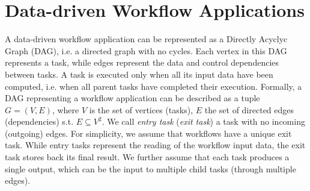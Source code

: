 \documentclass[a4paper, 10pt, conference]{ieeeconf}      %
\begin{document}
\section{Data-driven Workflow Applications}
\label{section:dag_applications}


A data-driven workflow application can be represented as a Directly Acyclyc Graph (DAG), i.e. a directed graph with no cycles. Each vertex in this DAG represents a task, while edges represent the data and control dependencies between tasks.  A task is executed only when all its input data have been computed, i.e. when all parent tasks have completed their execution.
Formally, a DAG representing a workflow application can be described as a tuple $G=(V,E)$, where $V$ is the set of vertices (tasks), $E$ the set of directed edges (dependencies) s.t. $E\subseteq V^2$.
We call \textit{entry task} (\textit{exit task}) a task with no incoming (outgoing) edges. For simplicity, we assume that workflows have a unique exit task.  While entry tasks represent the reading of the workflow input data, the exit task stores back its final result. We further assume that each task produces a single output, which can be the input to multiple child tasks (through multiple edges).




\end{document}
